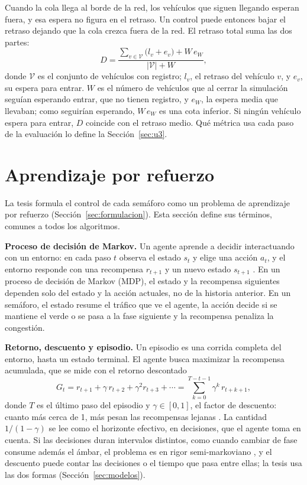 Cuando la cola llega al borde de la red, los vehículos que siguen llegando esperan fuera, y esa
espera no figura en el retraso. Un control puede entonces bajar el retraso dejando que la cola
crezca fuera de la red. El retraso total suma las dos partes:
\begin{equation}
  D = \frac{\sum_{v \in \mathcal{V}} \bigl(l_v + e_v\bigr) + W\, e_W}{|\mathcal{V}| + W},
  \label{eq:retraso-total}
\end{equation}
donde $\mathcal{V}$ es el conjunto de vehículos con registro; $l_v$, el retraso del vehículo $v$, y $e_v$,
su espera para entrar. $W$ es el número de vehículos que al cerrar la simulación seguían esperando
entrar, que no tienen registro, y $e_W$, la espera media que llevaban; como seguirían esperando,
$W\,e_W$ es una cota inferior. Si ningún vehículo espera para entrar, $D$ coincide con el retraso
medio. Qué métrica usa cada paso de la evaluación lo define la Sección~\ref{sec:u3}.

\section{Aprendizaje por refuerzo}
\label{sec:rl}

La tesis formula el control de cada semáforo como un problema de aprendizaje por refuerzo
(Sección~\ref{sec:formulacion}). Esta sección define sus términos, comunes a todos los algoritmos.

\noindent\textbf{Proceso de decisión de Markov.} Un agente aprende a decidir interactuando con un
entorno: en cada paso $t$ observa el estado $s_t$ y elige una acción $a_t$, y el entorno responde
con una recompensa $r_{t+1}$ y un nuevo estado $s_{t+1}$ \citep{SuttonBarto2018}. En un proceso de
decisión de Markov (MDP), el estado y la recompensa siguientes dependen solo del estado y la
acción actuales, no de la historia anterior. En un semáforo, el estado resume el tráfico que ve el
agente, la acción decide si se mantiene el verde o se pasa a la fase siguiente y la recompensa
penaliza la congestión.

\noindent\textbf{Retorno, descuento y episodio.} Un episodio es una corrida completa del entorno,
hasta un estado terminal. El agente busca maximizar la recompensa acumulada, que se mide con el
retorno descontado
\begin{equation}
  G_t = r_{t+1} + \gamma\, r_{t+2} + \gamma^2 r_{t+3} + \cdots = \sum_{k=0}^{T-t-1} \gamma^k\, r_{t+k+1},
  \label{eq:retorno}
\end{equation}
donde $T$ es el último paso del episodio y $\gamma \in [0,1]$, el factor de descuento: cuanto más
cerca de 1, más pesan las recompensas lejanas \citep{SuttonBarto2018}. La cantidad $1/(1-\gamma)$
se lee como el horizonte efectivo, en decisiones, que el agente toma en cuenta. Si las decisiones
duran intervalos distintos, como cuando cambiar de fase consume además el ámbar, el problema es en
rigor semi-markoviano \citep{SuttonBarto2018}, y el descuento puede contar las decisiones o el
tiempo que pasa entre ellas; la tesis usa las dos formas (Sección~\ref{sec:modelos}).

